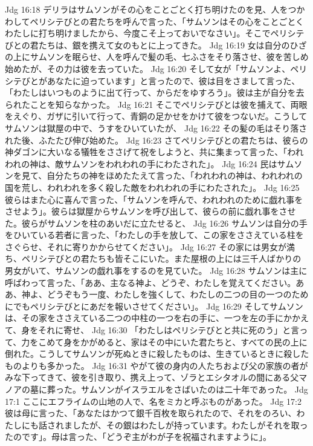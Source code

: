 Jdg 16:18  デリラはサムソンがその心をことごとく打ち明けたのを見、人をつかわしてペリシテびとの君たちを呼んで言った、「サムソンはその心をことごとくわたしに打ち明けましたから、今度こそ上っておいでなさい」。そこでペリシテびとの君たちは、銀を携えて女のもとに上ってきた。
Jdg 16:19  女は自分のひざの上にサムソンを眠らせ、人を呼んで髪の毛、七ふさをそり落させ、彼を苦しめ始めたが、その力は彼を去っていた。
Jdg 16:20  そして女が「サムソンよ、ペリシテびとがあなたに迫っています」と言ったので、彼は目をさまして言った、「わたしはいつものように出て行って、からだをゆすろう」。彼は主が自分を去られたことを知らなかった。
Jdg 16:21  そこでペリシテびとは彼を捕えて、両眼をえぐり、ガザに引いて行って、青銅の足かせをかけて彼をつないだ。こうしてサムソンは獄屋の中で、うすをひいていたが、
Jdg 16:22  その髪の毛はそり落された後、ふたたび伸び始めた。
Jdg 16:23  さてペリシテびとの君たちは、彼らの神ダゴンに大いなる犠牲をささげて祝をしようと、共に集まって言った、「われわれの神は、敵サムソンをわれわれの手にわたされた」。
Jdg 16:24  民はサムソンを見て、自分たちの神をほめたたえて言った、「われわれの神は、われわれの国を荒し、われわれを多く殺した敵をわれわれの手にわたされた」。
Jdg 16:25  彼らはまた心に喜んで言った、「サムソンを呼んで、われわれのために戯れ事をさせよう」。彼らは獄屋からサムソンを呼び出して、彼らの前に戯れ事をさせた。彼らがサムソンを柱のあいだに立たせると、
Jdg 16:26  サムソンは自分の手をひいている若者に言った、「わたしの手を放して、この家をささえている柱をさぐらせ、それに寄りかからせてください」。
Jdg 16:27  その家には男女が満ち、ペリシテびとの君たちも皆そこにいた。また屋根の上には三千人ばかりの男女がいて、サムソンの戯れ事をするのを見ていた。
Jdg 16:28  サムソンは主に呼ばわって言った、「ああ、主なる神よ、どうぞ、わたしを覚えてください。ああ、神よ、どうぞもう一度、わたしを強くして、わたしの二つの目の一つのためにでもペリシテびとにあだを報いさせてください」。
Jdg 16:29  そしてサムソンは、その家をささえている二つの中柱の一つを右の手に、一つを左の手にかかえて、身をそれに寄せ、
Jdg 16:30  「わたしはペリシテびとと共に死のう」と言って、力をこめて身をかがめると、家はその中にいた君たちと、すべての民の上に倒れた。こうしてサムソンが死ぬときに殺したものは、生きているときに殺したものよりも多かった。
Jdg 16:31  やがて彼の身内の人たちおよび父の家族の者がみな下ってきて、彼を引き取り、携え上って、ゾラとエシタオルの間にある父マノアの墓に葬った。サムソンがイスラエルをさばいたのは二十年であった。
Jdg 17:1  ここにエフライムの山地の人で、名をミカと呼ぶものがあった。
Jdg 17:2  彼は母に言った、「あなたはかつて銀千百枚を取られたので、それをのろい、わたしにも話されましたが、その銀はわたしが持っています。わたしがそれを取ったのです」。母は言った、「どうぞ主がわが子を祝福されますように」。
